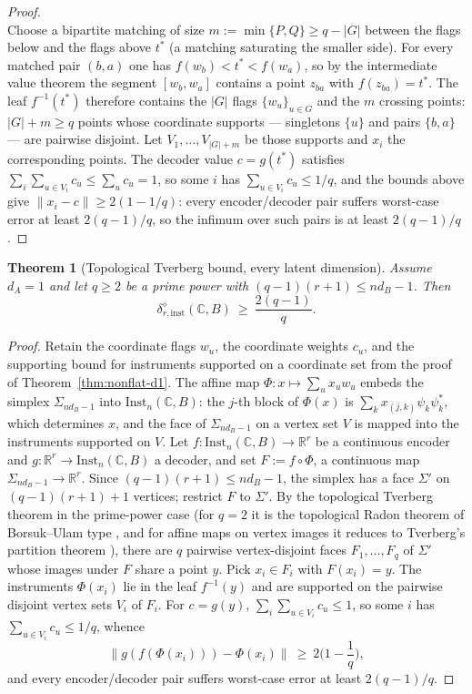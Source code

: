 \documentclass[11pt,a4paper]{article}
\newtheorem{theorem}{Theorem}[section]
\newcommand{\Inst}{\mathrm{Inst}}
\begin{document}
\begin{proof}
\[\]
Choose a bipartite matching of size $m:=\min\{P,Q\}\ge q-|G|$ between the flags below
and the flags above $t^\ast$ (a matching saturating the smaller side). For every
matched pair $(b,a)$ one has $f(w_b)<t^\ast<f(w_a)$, so by the intermediate value
theorem the segment $[w_b,w_a]$ contains a point $z_{ba}$ with $f(z_{ba})=t^\ast$. The
leaf $f^{-1}(t^\ast)$ therefore contains the $|G|$ flags $\{w_u\}_{u\in G}$ and the $m$
crossing points: $|G|+m\ge q$ points whose coordinate supports --- singletons $\{u\}$
and pairs $\{b,a\}$ --- are pairwise disjoint. Let $V_1,\dots,V_{|G|+m}$ be those
supports and $x_i$ the corresponding points. The decoder value $c=g(t^\ast)$ satisfies
$\sum_i\sum_{u\in V_i}c_u\le\sum_uc_u=1$, so some $i$ has
$\sum_{u\in V_i}c_u\le1/q$, and the bounds above give
$\|x_i-c\|\ge2(1-1/q)$: every encoder/decoder pair suffers worst-case error at least
$2(q-1)/q$, so the infimum over such pairs is at least $2(q-1)/q$.
\end{proof}

\begin{theorem}[Topological Tverberg bound, every latent dimension]
\label{thm:tverberg}
Assume $d_A=1$ and let $q\ge2$ be a prime power with $(q-1)(r+1)\le nd_B-1$. Then
\[
\delta_{r,\mathrm{inst}}^{\diamond}(\mathbb C,B)\ \ge\ \frac{2(q-1)}{q}.
\]
\end{theorem}

\begin{proof}
Retain the coordinate flags $w_u$, the coordinate weights $c_u$, and the supporting
bound for instruments supported on a coordinate set from the proof of
Theorem~\ref{thm:nonflat-d1}. The affine map $\Phi:x\mapsto\sum_ux_uw_u$ embeds the
simplex $\Sigma_{nd_B-1}$ into $\Inst_n(\mathbb C,B)$: the $j$-th block of $\Phi(x)$
is $\sum_kx_{(j,k)}\psi_k\psi_k^*$, which determines $x$, and the face of
$\Sigma_{nd_B-1}$ on a vertex set $V$ is mapped into the instruments supported on $V$.
Let $f:\Inst_n(\mathbb C,B)\to\mathbb R^r$ be a continuous encoder and
$g:\mathbb R^r\to\Inst_n(\mathbb C,B)$ a decoder, and set $F:=f\circ\Phi$, a
continuous map $\Sigma_{nd_B-1}\to\mathbb R^r$. Since $(q-1)(r+1)\le nd_B-1$, the
simplex has a face $\Sigma'$ on $(q-1)(r+1)+1$ vertices; restrict $F$ to $\Sigma'$.
By the topological Tverberg theorem in the prime-power case \cite{Ozaydin1987} (for
$q=2$ it is the topological Radon theorem of Borsuk--Ulam type
\cite{Matousek2003}, and for affine maps on vertex images it reduces to Tverberg's
partition theorem \cite{Tverberg1966}), there are $q$ pairwise vertex-disjoint faces
$F_1,\dots,F_q$ of $\Sigma'$ whose images under $F$ share a point $y$. Pick $x_i\in
F_i$ with $F(x_i)=y$. The instruments $\Phi(x_i)$ lie in the leaf $f^{-1}(y)$ and are
supported on the pairwise disjoint vertex sets $V_i$ of $F_i$. For $c=g(y)$,
$\sum_i\sum_{u\in V_i}c_u\le1$, so some $i$ has $\sum_{u\in V_i}c_u\le1/q$, whence
\[
\|g(f(\Phi(x_i)))-\Phi(x_i)\|\ \ge\ 2\Big(1-\frac1q\Big),
\]
and every encoder/decoder pair suffers worst-case error at least $2(q-1)/q$.
\end{proof}
\end{document}
